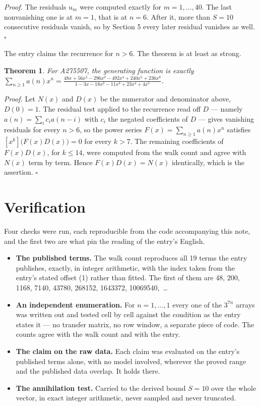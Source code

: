 \documentclass[11pt]{article}
\newtheorem{theorem}{Theorem}
\theoremstyle{definition}
\begin{document}
{\itshape Proof.} The residuals $u_m$ were computed exactly for $m = 1,\dots,40$. The last nonvanishing one is at $m = 1$, that is at $n = 6$. After it, more than $S = 10$ consecutive residuals vanish, so by Section 5 every later residual vanishes as well. $\square$

The entry claims the recurrence for $n > 6$. The theorem is at least as strong.

\begin{theorem} For A275507, the generating function is exactly $\sum_{n\ge 1} a(n)x^n = \frac{48x + 56x^{2} - 296x^{3} - 492x^{4} + 240x^{5} + 236x^{6}}{1 - 3x - 18x^{2} - 11x^{3} + 23x^{4} + 4x^{5}}$.\end{theorem}

{\itshape Proof.} Let $N(x)$ and $D(x)$ be the numerator and denominator above, $D(0)=1$. The residual test applied to the recurrence read off $D$ --- namely $a(n) = \sum_i c_i a(n-i)$ with $c_i$ the negated coefficients of $D$ --- gives vanishing residuals for every $n > 6$, so the power series $F(x)=\sum_{n\ge 1}a(n)x^n$ satisfies $[x^k]\bigl(F(x)D(x)\bigr) = 0$ for every $k > 7$. The remaining coefficients of $F(x)D(x)$, for $k \le 14$, were computed from the walk count and agree with $N(x)$ term by term. Hence $F(x)D(x) = N(x)$ identically, which is the assertion. $\square$

\section{Verification}

Four checks were run, each reproducible from the code accompanying this note, and the first two are what pin the reading of the entry's English.

\begin{itemize}

\item {\bfseries The published terms.} The walk count reproduces all 19 terms the entry publishes, exactly, in integer arithmetic, with the index taken from the entry's stated offset (1) rather than fitted. The first of them are 48, 200, 1168, 7140, 43780, 268152, 1643372, 10069540,~\dots

\item {\bfseries An independent enumeration.} For $n = 1,\dots,1$ every one of the $3^{7n}$ arrays was written out and tested cell by cell against the condition as the entry states it --- no transfer matrix, no row window, a separate piece of code. The counts agree with the walk count and with the entry.

\item {\bfseries The claim on the raw data.} Each claim was evaluated on the entry's published terms alone, with no model involved, wherever the proved range and the published data overlap. It holds there.

\item {\bfseries The annihilation test.} Carried to the derived bound $S = 10$ over the whole vector, in exact integer arithmetic, never sampled and never truncated.

\end{itemize}
\end{document}
